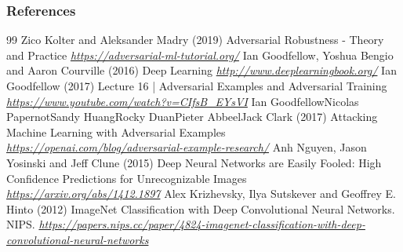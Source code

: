 \documentclass[11pt,compress,t,notes=noshow, xcolor=table]{beamer}
\begin{document}
\begin{vbframe}
\frametitle{References}
\footnotesize{
\begin{thebibliography}{99}
 Zico Kolter and Aleksander Madry (2019)
\newblock Adversarial Robustness - Theory and Practice
\newblock \emph{\url{https://adversarial-ml-tutorial.org/}}
 Ian Goodfellow, Yoshua Bengio and Aaron Courville (2016)
\newblock Deep Learning
\newblock \emph{\url{http://www.deeplearningbook.org/}}
 Ian Goodfellow (2017)
\newblock Lecture 16 | Adversarial Examples and Adversarial Training
\newblock \emph{\url{https://www.youtube.com/watch?v=CIfsB_EYsVI}}
  Ian GoodfellowNicolas PapernotSandy HuangRocky DuanPieter AbbeelJack Clark (2017)
\newblock Attacking Machine Learning with Adversarial Examples
\newblock \emph{\url{https://openai.com/blog/adversarial-example-research/}}
 Anh Nguyen, Jason Yosinski and Jeff Clune (2015)
\newblock Deep Neural Networks are Easily Fooled: High Confidence Predictions for Unrecognizable Images
\newblock \emph{\url{https://arxiv.org/abs/1412.1897}}
 Alex Krizhevsky, Ilya Sutskever and Geoffrey E. Hinto (2012)
\newblock ImageNet Classification with Deep Convolutional Neural Networks. NIPS. 
\newblock \emph{\url{https://papers.nips.cc/paper/4824-imagenet-classification-with-deep-convolutional-neural-networks}}

\end{thebibliography}}
\end{vbframe}
\end{document}
